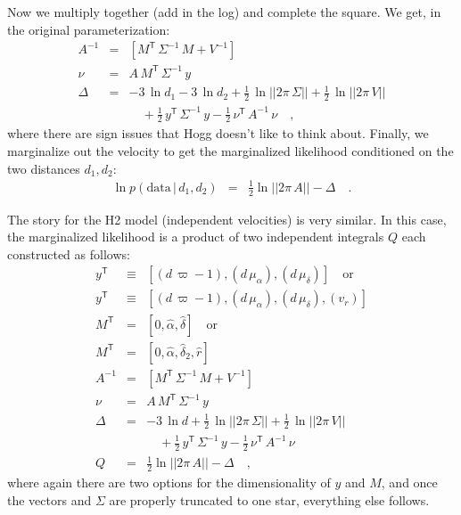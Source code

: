 \documentclass[manuscript, letterpaper]{aastex6}
\newcommand{\given}{\,|\,}
\newcommand{\transp}[1]{{#1}^{\!\mathsf{T}}}
\newcommand{\inv}[1]{{#1}^{-1}}
\newcommand{\data}{\mathrm{data}}
\begin{document}
Now we multiply together (add in the log) and complete the square.
We get, in the original parameterization:
\begin{eqnarray}
  \inv{A} &=& [\transp{M}\,\inv{\Sigma}\,M+\inv{V}]
  \\
  \nu &=& A\,\transp{M}\,\inv{\Sigma}\,y
  \\
  \Delta &=& -3\,\ln d_1 -3\,\ln d_2
  +\frac{1}{2}\,\ln||2\pi\,\Sigma|| +\frac{1}{2}\,\ln||2\pi\,V|| \nonumber \\ && \quad
  +\frac{1}{2}\,\transp{y}\,\inv{\Sigma}\,y -\frac{1}{2}\,\transp{\nu}\,\inv{A}\,\nu
  \quad ,
\end{eqnarray}
where there are sign issues that Hogg doesn't like to think about.
Finally, we marginalize out the velocity to get the marginalized
likelihood conditioned on the two distances $d_1, d_2$:
\begin{eqnarray}
  \ln p(\data\given d_1,d_2)
  &=& \frac{1}{2}\ln ||2\pi\,A|| -\Delta
  \quad .
\end{eqnarray}

The story for the H2 model (independent velocities) is very
similar. In this case, the marginalized likelihood is a product of
two independent integrals $Q$ each constructed as follows:
\begin{eqnarray}
  \transp{y} &\equiv& [(d\,\varpi - 1), (d\,\mu_{\alpha}), (d\,\mu_{\delta})] \quad \mbox{or}
  \\
  \transp{y} &\equiv& [(d\,\varpi - 1), (d\,\mu_{\alpha}), (d\,\mu_{\delta}), (v_{r})]
  \\
  \transp{M} &=& [0, \hat{\alpha}, \hat{\delta}] \quad \mbox{or}
  \\
  \transp{M} &=& [0, \hat{\alpha}, \hat{\delta}_2, \hat{r}]
  \\
  \inv{A} &=& [\transp{M}\,\inv{\Sigma}\,M+\inv{V}]
  \\
  \nu &=& A\,\transp{M}\,\inv{\Sigma}\,y
  \\
  \Delta &=& -3\,\ln d
  +\frac{1}{2}\,\ln||2\pi\,\Sigma|| +\frac{1}{2}\,\ln||2\pi\,V|| \nonumber \\ && \quad
  +\frac{1}{2}\,\transp{y}\,\inv{\Sigma}\,y -\frac{1}{2}\,\transp{\nu}\,\inv{A}\,\nu
  \\
  Q &=& \frac{1}{2}\ln ||2\pi\,A|| -\Delta
  \quad ,
\end{eqnarray}
where again there are two options for the dimensionality of $y$ and
$M$, and once the vectors and $\Sigma$ are properly truncated to one
star, everything else follows.
\end{document}
